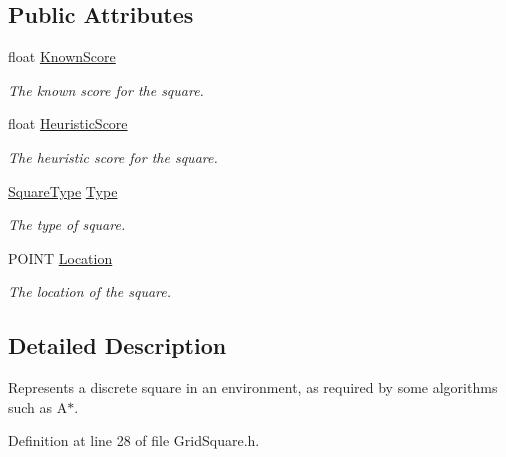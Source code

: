 \subsection*{Public Attributes}
\begin{DoxyCompactItemize}
\item 
float \hyperlink{class_native_route_finders_1_1_grid_square_abcfebccecea6a8ddda2ded4361a94412}{Known\-Score}
\begin{DoxyCompactList}\small\item\em The known score for the square. \end{DoxyCompactList}\item 
float \hyperlink{class_native_route_finders_1_1_grid_square_aa6cfee6d9eb4bf425dfd6b4942160362}{Heuristic\-Score}
\begin{DoxyCompactList}\small\item\em The heuristic score for the square. \end{DoxyCompactList}\item 
\hyperlink{namespace_native_route_finders_a999338a470482866455cb63c5e932b6a}{Square\-Type} \hyperlink{class_native_route_finders_1_1_grid_square_a004dc984a2bcff5c31920e78cab22cfd}{Type}
\begin{DoxyCompactList}\small\item\em The type of square. \end{DoxyCompactList}\item 
P\-O\-I\-N\-T \hyperlink{class_native_route_finders_1_1_grid_square_a2e55684426636e77203e495c0dd89505}{Location}
\begin{DoxyCompactList}\small\item\em The location of the square. \end{DoxyCompactList}\end{DoxyCompactItemize}


\subsection{Detailed Description}
Represents a discrete square in an environment, as required by some algorithms such as A$\ast$. 

Definition at line 28 of file Grid\-Square.\-h.



